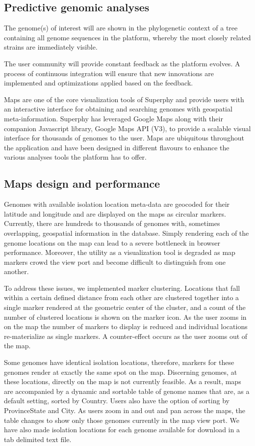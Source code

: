 \documentclass{bmcart}
\begin{document}
\subsection{Predictive genomic analyses}
The genome(s) of interest will are shown in the phylogenetic context of a tree containing all genome sequences in the platform, whereby the most closely related strains are immediately visible.

The user community will provide constant feedback as the platform evolves. A process of continuous integration will ensure that new innovations are implemented and optimizations applied based on the feedback.

Maps are one of the core visualization tools of Superphy and provide users with an interactive interface for obtaining and searching genomes with geospatial meta-information. Superphy has leveraged Google Maps along with their companion Javascript library, Google Maps API (V3), to provide a scalable visual interface for thousands of genomes to the user. Maps are ubiquitous throughout the application and have been designed in different flavours to enhance the various analyses tools the platform has to offer.

\subsection{Maps design and performance}
Genomes with available isolation location meta-data are geocoded for their latitude and longitude and  are displayed on the maps as circular markers. Currently, there are hundreds to thousands of genomes with, sometimes overlapping, geospatial information in the database. Simply rendering each of the genome locations on the map can lead to a severe bottleneck in browser performance. Moreover, the utility as a visualization tool is degraded as map markers crowd the view port and become difficult to distinguish from one another.

To address these issues, we implemented marker clustering. Locations that fall within a certain defined distance from each other are clustered together into a single marker rendered at the geometric center of the cluster, and a count of the number of clustered locations is shown on the marker icon. As the user zooms in on the map the number of markers to display is reduced and individual locations re-materialize as single markers. A counter-effect occurs as the user zooms out of the map. 

Some genomes have identical isolation locations, therefore, markers for these genomes render at exactly the same spot on the map. Discerning genomes, at these locations, directly on the map is not currently feasible. As a result, maps are accompanied by a dynamic and sortable table of genome names that are, as a default setting, sorted by Country. Users also have the option of sorting by ProvinceState and City. As users zoom in and out and pan across the maps, the table changes to show only those genomes currently in the map view port. We have also made isolation locations for each genome available for download in a tab delimited text file.
\end{document}
